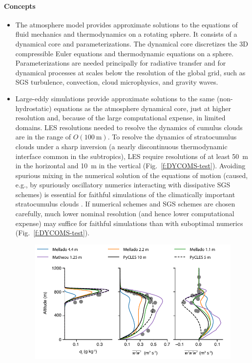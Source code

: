 \documentclass{article}
\begin{document}
\paragraph{Concepts}
\begin{itemize}
    \item The atmosphere model provides approximate solutions to the equations of fluid mechanics and thermodynamics on a rotating sphere. It consists of a dynamical core and parameterizations. The dynamical core discretizes the 3D compressible Euler equations and thermodynamic equations on a sphere. Parameterizations are needed principally for radiative transfer and for dynamical processes at scales below the resolution of the global grid, such as SGS turbulence, convection, cloud microphysics, and gravity waves.
    \item Large-eddy simulations provide approximate solutions to the same (non-hydro\-static) equations as the atmosphere dynamical core, just at higher resolution and, because of the large computational expense, in limited domains. LES resolutions needed to resolve the dynamics of cumulus clouds are in the range of $O(100~\mathrm{m})$. To resolve the dynamics of stratocumulus clouds under a sharp inversion (a nearly discontinuous thermodynamic interface common in the subtropics), LES require resolutions of at least 50~m in the horizontal and 10~m in the vertical (Fig.~\ref{f:DYCOMS-test}). Avoiding spurious mixing in the numerical solution of the equations of motion (caused, e.g., by spuriously oscillatory numerics interacting with dissipative SGS schemes) is essential for faithful simulations of the climatically important stratocumulus clouds \citep{Pressel17a}. If numerical schemes and SGS schemes are chosen carefully, much lower nominal resolution (and hence lower computational expense) may suffice for faithful simulations than with suboptimal numerics (Fig.~\ref{f:DYCOMS-test}).
 \begin{figure}[htb]
     \centerline{\includegraphics[width=\textwidth]{DYCOMS_tests.pdf}}

\end{figure}
\end{itemize}
\end{document}
